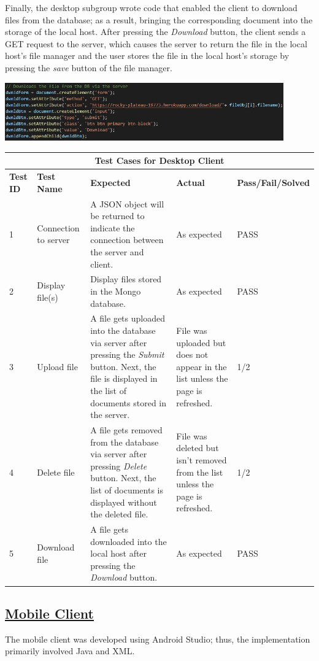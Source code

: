 \documentclass{article}
\begin{document}
Finally, the desktop subgroup wrote code that enabled the client to download files from the database; as a result, bringing the corresponding document into the storage of the local host. After pressing the \textit{Download} button, the client sends a GET request to the server, which causes the server to return the file in the local host's file manager and the user stores the file in the local host's storage by pressing the \textit{save} button of the file manager. 

\includegraphics[width=12cm]{download}

\begin{tabular}{|p{2cm}|p{2cm}|p{3cm}|p{3cm}|p{3cm}|}
\hline
\multicolumn{5}{|c|}{\textbf{Test Cases for Desktop Client}} \\
\hline
\textbf{Test ID} & \textbf{Test Name} & \textbf{Expected} & \textbf{Actual} & \textbf{Pass/Fail/Solved} \\
\hline
1 & Connection to server & A JSON object will be returned to indicate the connection between the server and client.  & As expected & PASS \\
\hline
2 & Display file(s) & Display files stored in the Mongo database. & As expected & PASS \\
\hline
3 & Upload file & A file gets uploaded into the database via server after pressing the \textit{Submit} button. Next, the file is displayed in the list of documents stored in the server. & File was uploaded but does not appear in the list unless the page is refreshed. & 1/2 \\
\hline
4 & Delete file & A file gets removed from the database via server after pressing \textit{Delete} button. Next, the list of documents is displayed without the deleted file. & File was deleted but isn't removed from the list unless the page is refreshed. & 1/2 \\
\hline
5 & Download file & A file gets downloaded into the local host after pressing the \textit{Download} button. & As expected & PASS \\
\hline
\end{tabular}

\subsection{\underline{Mobile Client}}
The mobile client was developed using Android Studio; thus, the implementation primarily involved Java and XML.
\end{document}
